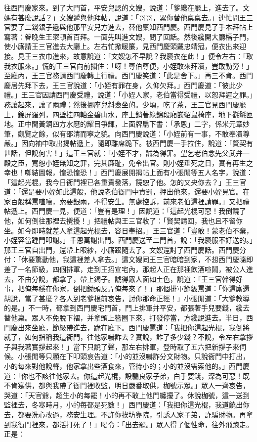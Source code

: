 \begin{showcontents}{}
往西門慶家來。到了大門首，平安兒認的文嫂，說道：「爹纔在廳上，進去了。文媽有甚麼說話？」文嫂遞與他拜帖，說道：「哥哥，累你替他稟稟去。」連忙問王三官要了二錢銀子遞與他那平安兒方進去，替他稟知西門慶。西門慶見了手本拜帖上寫著：眷晚生王寀頓首百拜。一面先叫進文嫂，問了回話。然後纔開大廳槅子門，使小廝請王三官進去大廳上。左右忙掀暖簾，見西門慶頭戴忠靖冠，便衣出來迎接。見王三衣巾進來，故意說道：「文嫂怎不早說？我褻衣在此！」便令左右：「取我衣服來。」慌的王三官向前攔住：「呀！尊伯尊便，小姪敢來拜凟，豈敢動勞！」至廳內，王三官務請西門慶轉上行禮。西門慶笑道：「此是舍下。」再三不肯。西門慶居先拜下去，王三官說道：「小姪有罪在身，久仰欠拜。」西門慶道：「彼此少禮。」王三官因請西門慶受禮，說道：「小姪人家，老伯當得受禮，以恕拜遲之罪。」務讓起來，讓了兩禮；然後挪座兒斜僉坐的。少頃，吃了茶，王三官見西門慶廳上，錦屏羅列，四壁挂四軸金碧山水，座上銷著綠錦段廂嵌貂鼠椅座，地下氍毹匝地。正中間黃銅四方水磨的耀目爭輝，上面牌扁下書：「承恩」二字，係米元章妙筆，觀覽之餘，似有邵清而寧之貌。向西門慶說道：「小姪前有一事，不敢奉凟尊嚴。」因向袖中取出揭帖遞上，隨即離席跪下。被西門慶一手拉住，說道：「賢契有甚話，但說何害！」這王三官就：「小姪不才，誠為得罪。望乞老伯念先父武弁一殿之臣，寬恕小姪無知之罪，完其廉耻，免令出官。則小姪垂死之日，實有再生之幸也！啣結圖報，惶恐惶恐！」西門慶展開揭帖上面有小張閒等五人名字，說道：「這起光棍，我今日衙門裡已各重責發落，饒恕了他。怎的又央你去？」王三官道：「還是要小姪如此這般，他說老伯衙門中責罰，押出他來，還要小姪見官。在家百般稱罵喧嚷，索要銀兩，不得安生。無處控訴，前來老伯這裡請罪。」又把禮帖遞上。西門慶一見，便道：「豈有是理！」因說道：「這起光棍可惡！我倒饒了他，如何倒往那裡去攪擾！」把禮帖與王三官收了：「賢契請回，我也且不留你坐。如今即時就差人拿這起光棍去，容日奉招。」王三官道：「豈敢！蒙老伯不棄，小姪容當踵門叩謝。」千恩萬謝出門。西門慶送至二門首，說：「我褻服不好送的。」那王三官自出門，還帶上眼紗，小廝跟隨去了。文嫂還討了西門慶話。西門慶分付：「休要驚動他，我這裡差人拿去。」這文嫂同王三官暗暗到家，不想西門慶隨即差了一名節級，四個排軍，走到王招宣宅內，那起人正在那裡飲酒喧鬧，被公人進去，不由分說，都拿了，帶上鐲子。諕得眾人面如土色，說道：「王三官幹得好事，把俺每穩在你家，倒把鋤頭反弄俺每來了！」那個排軍節級罵道：「你這廝還胡說，當了甚麼？各人到老爹根前哀告，討你那命正經！」小張閒道：「大爹教導的是。」不一時，都拿到西門慶宅門首，門上排軍并平安，都張著手兒要錢，纔去替他稟。眾人不免脫下褶，并拿頭上簪圈下來，打發停當，方纔說進去。半日，西門慶出來坐廳，節級帶進去，跪在廳下。西門慶罵道：「我把你這起光棍，我倒將就了，如何指稱我這衙門，往他家嚇詐去？實說，詐了多少錢？不說，令左右拿拶子與我著實拶起來！」當下只說了聲，那左右排軍，登時取了五六把新拶子來伺候。小張閒等只顧在下叩頭哀告道：「小的並沒嚇詐分文財物。只說衙門中打出，小的每來對他說聲，他家拿出些酒食來，管待小的；小的並沒需索他的。」西門慶道：「你也不該往他家去。你這起光棍，設騙良家子弟，白手要錢，深為可惡！既不肯寔供，都與我帶了衙門裡收監，明日嚴番取供，枷號示眾。」眾人一齊哀告，哭道：「天官爺，超生小的每罷！小的再不敢上他門纏擾了。休說枷號，這一送到監裡去，冬寒時月，小的每都是死數！」西門慶道：「我把你這光棍，我道饒出你去，都要洗心改過，務安生理。不許你挨坊靠院，引誘人家子弟，詐騙財物。再拿到我衙門裡來，都活打死了！」喝令：「出去罷。」眾人得了個性命，往外飛跑走。正是：


\end{showcontents}
